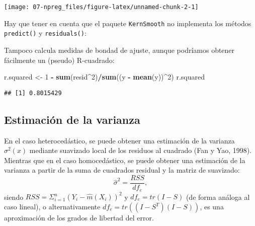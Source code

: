\documentclass[
]{book}
\newenvironment{Shaded}{\begin{snugshade}}{\end{snugshade}}
\newcommand{\CommentTok}[1]{\textcolor[rgb]{0.56,0.35,0.01}{\textit{#1}}}
\newcommand{\DataTypeTok}[1]{\textcolor[rgb]{0.13,0.29,0.53}{#1}}
\newcommand{\DecValTok}[1]{\textcolor[rgb]{0.00,0.00,0.81}{#1}}
\newcommand{\KeywordTok}[1]{\textcolor[rgb]{0.13,0.29,0.53}{\textbf{#1}}}
\newcommand{\NormalTok}[1]{#1}
\newcommand{\OperatorTok}[1]{\textcolor[rgb]{0.81,0.36,0.00}{\textbf{#1}}}
\newcommand{\StringTok}[1]{\textcolor[rgb]{0.31,0.60,0.02}{#1}}
\theoremstyle{break}
\theoremstyle{definition}
\theoremstyle{definition}
\theoremstyle{definition}
\theoremstyle{remark}
\begin{document}
\begin{center}\texttt{[image: 07-npreg\_files/figure-latex/unnamed-chunk-2-1]} \end{center}

Hay que tener en cuenta que el paquete \texttt{KernSmooth} no implementa los métodos
\texttt{predict()} y \texttt{residuals()}:

\begin{Shaded}
\end{Shaded}

Tampoco calcula medidas de bondad de ajuste, aunque podríamos obtener fácilmente un (pseudo) R-cuadrado:

\begin{Shaded}
\begin{Highlighting}[]
\NormalTok{r.squared <-}\StringTok{ }\DecValTok{1} \OperatorTok{-}\StringTok{ }\KeywordTok{sum}\NormalTok{(resid}\OperatorTok{^}\DecValTok{2}\NormalTok{)}\OperatorTok{/}\KeywordTok{sum}\NormalTok{((y }\OperatorTok{-}\StringTok{ }\KeywordTok{mean}\NormalTok{(y))}\OperatorTok{^}\DecValTok{2}\NormalTok{)}
\NormalTok{r.squared}
\end{Highlighting}
\end{Shaded}

\begin{verbatim}
## [1] 0.8015429
\end{verbatim}

\hypertarget{estimaciuxf3n-de-la-varianza}{%
\subsection{Estimación de la varianza}\label{estimaciuxf3n-de-la-varianza}}

En el caso heterocedástico, se puede obtener una estimación de la varianza
\(\sigma^2(x)\) mediante suavizado local de los residuos al cuadrado
(Fan y Yao, 1998). Mientras que en el caso homocedástico, se puede obtener
una estimación de la varianza a partir de la suma de cuadrados residual y la
matriz de suavizado:
\[\hat\sigma^2 = \frac{RSS}{df_e},\]
siendo \(RSS=\Sigma_{i=1}^n \left( Y_i - \hat m(X_i) \right)^2\)
y \(df_e = tr(I - S)\) (de forma análoga al caso lineal), o alternativamente \(df_e = tr \left( (I - S^{T})(I - S)\right)\), es una aproximación de los grados de libertad del error.
\end{document}
